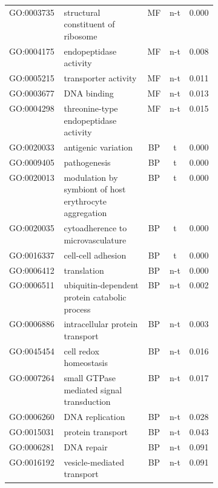 \begin{table}
\begin{center}
\begin{tabular}{lp{0.4\linewidth}ccc}
GO:0003735 & structural constituent of ribosome & MF  & n-t & 0.000\\
GO:0004175 & endopeptidase activity & MF  & n-t  & 0.008\\
GO:0005215 & transporter activity & MF  & n-t  & 0.011\\
GO:0003677 & DNA binding & MF  & n-t  & 0.013\\
GO:0004298 & threonine-type endopeptidase activity & MF  & n-t  & 0.015\\
GO:0020033 & antigenic variation & BP & t & 0.000\\
GO:0009405 & pathogenesis & BP & t & 0.000\\
GO:0020013 & modulation by symbiont of host erythrocyte aggregation & BP & t & 0.000\\
GO:0020035 & cytoadherence to microvasculature & BP & t & 0.000\\
GO:0016337 & cell-cell adhesion & BP & t & 0.000\\
GO:0006412 & translation & BP & n-t  & 0.000\\
GO:0006511 & ubiquitin-dependent protein catabolic process & BP & n-t  & 0.002\\
GO:0006886 & intracellular protein transport & BP & n-t  & 0.003\\
GO:0045454 & cell redox homeostasis & BP & n-t  & 0.016\\
GO:0007264 & small GTPase mediated signal transduction & BP & n-t  & 0.017\\
GO:0006260 & DNA replication & BP & n-t  & 0.028\\
GO:0015031 & protein transport & BP & n-t  & 0.043\\
GO:0006281 & DNA repair & BP & n-t  & 0.091\\
GO:0016192 & vesicle-mediated transport & BP & n-t  & 0.091\\
\hline
\end{tabular}
\end{center}
\label{table:SchizontsFirstPro}
\end{table}
\clearpage

